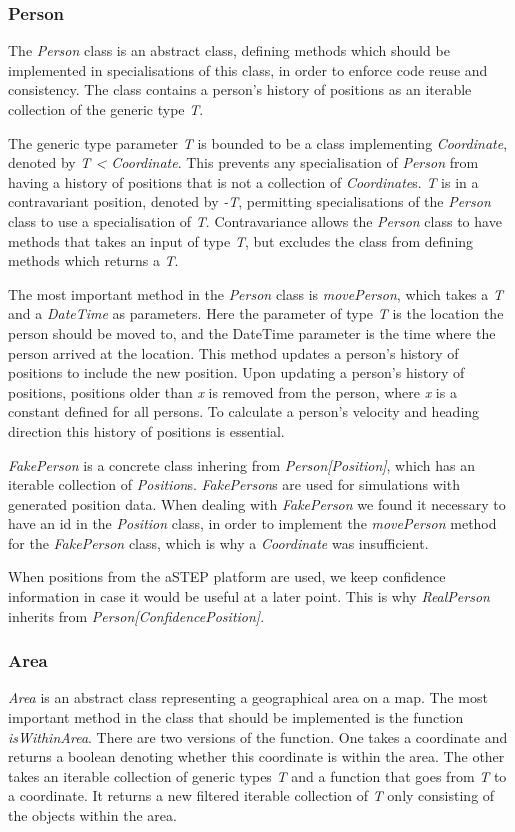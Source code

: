 \subsubsection{Person}
The \emph{Person} class is an abstract class, defining methods which should be implemented in specialisations of this class, in order to enforce code reuse and consistency. The class contains a person's history of positions as an iterable collection of the generic type \emph{T}. 

The generic type parameter \emph{T} is bounded to be a class implementing \emph{Coordinate}, denoted by \emph{T < Coordinate}. This prevents any specialisation of \emph{Person} from having a history of positions that is not a collection of \emph{Coordinate}s. \emph{T} is in a contravariant position, denoted by \emph{-T}, permitting specialisations of the \emph{Person} class to use a specialisation of \emph{T}. Contravariance allows the \emph{Person} class to have methods that takes an input of type \emph{T}, but excludes the class from defining methods which returns a \emph{T}. 

The most important method in the \emph{Person} class is \emph{movePerson}, which takes a \emph{T} and a \emph{DateTime} as parameters. Here the parameter of type \emph{T} is the location the person should be moved to, and the DateTime parameter is the time where the person arrived at the location. This method updates a person's history of positions to include the new position. Upon updating a person's history of positions, positions older than \emph{x} is removed from the person, where \emph{x} is a constant defined for all persons. To calculate a person's velocity and heading direction this history of positions is essential.

\emph{FakePerson} is a concrete class inhering from \emph{Person[Position]}, which has an iterable collection of \emph{Position}s. \emph{FakePerson}s are used for simulations with generated position data. When dealing with \emph{FakePerson} we found it necessary to have an id in the \emph{Position} class, in order to implement the \emph{movePerson} method for the \emph{FakePerson} class, which is why a \emph{Coordinate} was insufficient. 

When positions from the aSTEP platform are used, we keep confidence information in case it would be useful at a later point. This is why \emph{RealPerson} inherits from \emph{Person[ConfidencePosition]}.

\subsubsection{Area}
\emph{Area} is an abstract class representing a geographical area on a map. The most important method in the class that should be implemented is the function \emph{isWithinArea}. There are two versions of the function. One takes a coordinate and returns a boolean denoting whether this coordinate is within the area. The other takes an iterable collection of generic types \emph{T} and a function that goes from \emph{T} to a coordinate. It returns a new filtered iterable collection of \emph{T} only consisting of the objects within the area.

